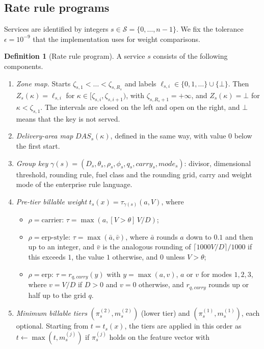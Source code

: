 \documentclass[11pt]{article}
\theoremstyle{definition}
\newtheorem{definition}[theorem]{Definition}
\theoremstyle{remark}
\newcommand{\SC}{\mathcal S}
\begin{document}
\subsection{Rate rule programs}
Services are identified by integers $s\in\SC=\{0,\dots,n-1\}$. We fix the tolerance
$\epsilon=10^{-9}$ that the implementation uses for weight comparisons.

\begin{definition}[Rate rule program]\label{def:program}
A service $s$ consists of the following components.
\begin{enumerate}[label=(\roman*),leftmargin=*]
\item \emph{Zone map.} Starts $\zeta_{s,1}<\dots<\zeta_{s,R_s}$ and labels
$\ell_{s,i}\in\{0,1,\dots\}\cup\{\bot\}$. Then $Z_s(\kappa)=\ell_{s,i}$ for
$\kappa\in[\zeta_{s,i},\zeta_{s,i+1})$, with $\zeta_{s,R_s+1}=+\infty$, and $Z_s(\kappa)=\bot$ for
$\kappa<\zeta_{s,1}$. The intervals are closed on the left and open on the right, and $\bot$
means that the key is not served.
\item \emph{Delivery-area map} $\mathit{DAS}_s(\kappa)$, defined in the same way, with value $0$
below the first start.
\item \emph{Group key} $\gamma(s)=(D_s,\theta_s,\rho_s,\phi_s,q_s,\mathit{carry}_s,\mathit{mode}_s)$:
divisor, dimensional threshold, rounding rule, fuel class and the rounding grid, carry
and weight mode of the enterprise rule language.
\item \emph{Pre-tier billable weight} $t_s(x)=\tau_{\gamma(s)}(a,V)$, where
\begin{itemize}[leftmargin=*]
\item $\rho=\text{carrier}$: $\tau=\max(a,[V>\theta]\,V/D)$;
\item $\rho=\text{erp-style}$: $\tau=\max(\bar a,\bar v)$, where $\bar a$ rounds $a$ down to
$0.1$ and then up to an integer, and $\bar v$ is the analogous rounding of
$\lceil 1000V/D\rceil/1000$ if this exceeds $1$, the value $1$ otherwise, and $0$ unless
$V>\theta$;
\item $\rho=\text{erp}$: $\tau=r_{q,\mathit{carry}}(y)$ with $y=\max(a,v)$, $a$ or $v$ for modes
$1,2,3$, where $v=V/D$ if $D>0$ and $v=0$ otherwise, and $r_{q,\mathit{carry}}$ rounds up or
half up to the grid $q$.
\end{itemize}
\item \emph{Minimum billable tiers} $(\pi^{(2)}_s,m^{(2)}_s)$ (lower tier) and
$(\pi^{(1)}_s,m^{(1)}_s)$, each optional. Starting from $t=t_s(x)$, the tiers are applied in
this order as $t\leftarrow\max(t,m^{(j)}_s)$ if $\pi^{(j)}_s$ holds on the feature vector with

\end{enumerate}
\end{definition}
\end{document}

